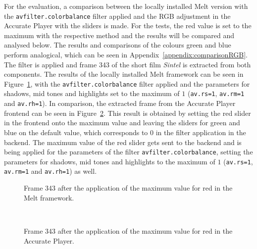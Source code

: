 \documentclass[../MasterThesis.tex]{subfiles}
\begin{document}
For the evaluation, a comparison between the locally installed Melt version with the \texttt{avfilter.colorbalance} filter applied and the RGB adjustment in the Accurate Player with the sliders is made.
For the tests, the red value is set to the maximum with the respective method and the results will be compared and analysed below. The results and comparisons of the colours green and blue perform analogical, which can be seen in Appendix~\ref{appendix:comparisonRGB}.
The filter is applied and frame 343 of the short film \textit{Sintel} is extracted from both components. The results of the locally installed Melt framework can be seen in Figure~\ref{figure:redMelt}, with the \texttt{avfilter.colorbalance} filter applied and the parameters for shadows, mid tones and highlights set to the maximum of $1$ (\texttt{av.rs=1}, \texttt{av.rm=1} and \texttt{av.rh=1}).
In comparison, the extracted frame from the Accurate Player frontend can be seen in Figure~\ref{figure:redAP}. This result is obtained by setting the red slider in the frontend onto the maximum value and leaving the sliders for green and blue on the default value, which corresponds to $0$ in the filter application in the backend. The maximum value of the red slider gets sent to the backend and is being applied for the parameters of the filter \texttt{avfilter.colorbalance}, setting the parameters for shadows, mid tones and highlights to the maximum of $1$ (\texttt{av.rs=1}, \texttt{av.rm=1} and \texttt{av.rh=1}) as well.



\begin{minipage}{0.48\textwidth}
	
	\begin{figure}[H]
		\begin{center}
			\caption[Frame 343 after the application of the red filter in the Melt framework.]{Frame 343 after the application of the maximum value for red in the Melt framework.}
			\label{figure:redMelt}
		\end{center}
	\end{figure}
\end{minipage}\begin{minipage}{0.04\textwidth}
	\ 
\end{minipage}\begin{minipage}{0.48\textwidth}
	
	\begin{figure}[H]
		\begin{center}
			\caption[Frame 343 after the application of the red filter in the Accurate Player.]{Frame 343 after the application of the maximum value for red in the Accurate Player.}
			\label{figure:redAP}
		\end{center}
	\end{figure}
\end{minipage}
\end{document}
